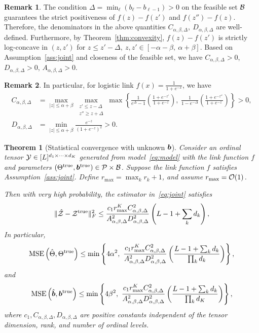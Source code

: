 \documentclass{article}
\theoremstyle{plain}
\newtheorem{thm}{Theorem}[section]
\theoremstyle{definition}
\newtheorem{rmk}{Remark}
\begin{document}
\begin{rmk}
The condition $\Delta=\min_{\ell}(b_{\ell}-b_{\ell-1})>0$ on the feasible set $\mathcal{B}$ guarantees the strict positiveness of $f(z)-f(z')$ and $f(z'')-f(z)$. Therefore, the denominators in the above quantities $C_{\alpha,\beta,\Delta},\ D_{\alpha,\beta,\Delta}$ are well-defined. Furthermore, by Theorem~\ref{thm:convexity}, $f(z)-f(z')$ is strictly log-concave in $(z,z')$ for $z\leq z'-\Delta,\ z,z'\in[-\alpha-\beta,\ \alpha+\beta]$. Based on Assumption~\ref{ass:joint} and closeness of the feasible set, we have $C_{\alpha,\beta,\Delta}>0$, $D_{\alpha,\beta,\Delta}>0$, $A_{\alpha,\beta,\Delta}>0$.
\end{rmk}
\begin{rmk} In particular, for logistic link $f(x)= \frac{1}{1+e^{-x}}$, we have
\begin{align}
C_{\alpha,\beta,\Delta}&=\max_{|z|\leq \alpha+\beta}\max_{\substack{z'\leq z-\Delta\\z''\geq z+\Delta}}\max\left\{ \frac{1}{e^\Delta-1}\left(\frac{1+e^{-z'}}{1+e^{-z}}\right),\ \frac{1}{1-e^{-\Delta}}\left(\frac{1+e^{-z''}}{1+e^{-z}}\right)\right\}>0,\\
D_{\alpha,\beta,\Delta}&=\min_{|z|\leq \alpha+\beta}\frac{e^{-z}}{(1+e^{-z})^2}>0.\end{align}
\end{rmk}
\begin{thm}[Statistical convergence with unknown $\bm{b}$]\label{thm:ratejoint}
Consider an ordinal tensor $\mathcal{Y}\in[L]^{d_1\times \cdots \times d_K}$ generated from model~\eqref{eq:model} with the link function $f$ and parameters $(\Theta^{\mathrm{true}}, \bm{b}^{\mathrm{true}})\in\mathcal{P}\times \mathcal{B}$. Suppose the link function $f$ satisfies Assumption~\ref{ass:joint}. Define $r_{\max}=\max_k r_k+1$, and assume $r_{\max}=\mathcal{O}(1)$. 

Then with very high probability, the estimator in~\eqref{eq:joint} satisfies
\begin{equation}\label{eq:scoreZ}
\lVert\hat {\mathcal{Z}}-\mathcal{Z}^{\mathrm{true}}\rVert_F^2 \leq {c_1r^{K}_{\max}C^2_{\alpha,\beta,\Delta}\over A^2_{\alpha,\beta,\Delta}D^2_{\alpha,\beta,\Delta}}\left(L-1+\sum_k d_k\right),
\end{equation}
In particular,
\begin{equation}\label{eq:jointTheta}
\mathrm{MSE}\left(\hat \Theta, \Theta^{\mathrm{true}} \right)\leq\min\left\{ 4\alpha^2,\  {c_1 r_{\max}^{K}  C_{\alpha,\beta,\Delta}^2 \over A^2_{\alpha,\beta,\Delta}D_{\alpha,\beta,\Delta}^2}\left({ L-1+\sum_k d_k \over \prod_k d_k}\right)\right\},
\end{equation}
and
\begin{equation}\label{eq:jointb}
\mathrm{MSE}\left(\hat \mb, \trueb \right)\leq \min\left\{4\beta^2,\ {c_1 r^{K}_{\max} C^2_{\alpha,\beta,\Delta} \over A^2_{\alpha,\beta,\Delta}D_{\alpha,\beta,\Delta}^2}\left({L-1+\sum_kd_k \over \prod_k d_K}\right)\right\},
\end{equation}
where $c_1, C_{\alpha,\beta,\Delta}, D_{\alpha,\beta,\Delta}$ are positive constants independent of the tensor dimension, rank, and number of ordinal levels. 
\end{thm}
\end{document}
